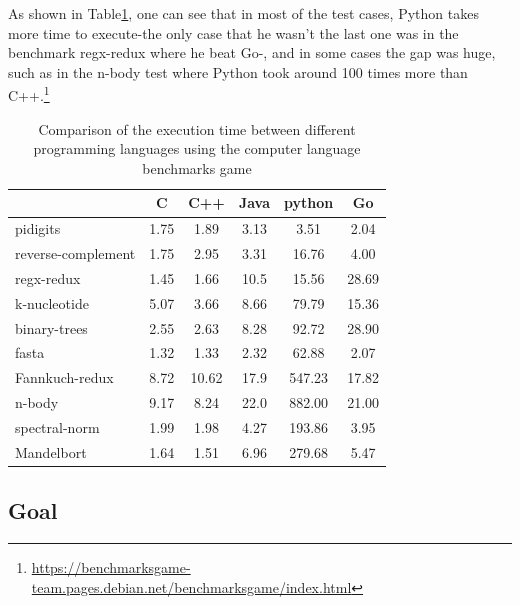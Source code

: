 As shown in Table\ref{fig:clbg}, one can see that in most of the test cases, Python takes more time to execute-the only case that he wasn't the last one was in the benchmark regx-redux where he beat Go-, and in some cases the gap was huge, such as in the n-body test where Python took around 100 times more than C++.\footnote{\url{https://benchmarksgame-team.pages.debian.net/benchmarksgame/index.html}}
\begin{table}[hbt]
    \begin{tabular}{l|*{5}c}
                           & C    & C++   & Java & python & Go    \\
        \hline
        pidigits           & 1.75 & 1.89  & 3.13 & 3.51   & 2.04  \\
        reverse-complement & 1.75 & 2.95  & 3.31 & 16.76  & 4.00  \\
        regx-redux         & 1.45 & 1.66  & 10.5 & 15.56  & 28.69 \\
        k-nucleotide       & 5.07 & 3.66  & 8.66 & 79.79  & 15.36 \\
        binary-trees       & 2.55 & 2.63  & 8.28 & 92.72  & 28.90 \\
        fasta              & 1.32 & 1.33  & 2.32 & 62.88  & 2.07  \\
        Fannkuch-redux     & 8.72 & 10.62 & 17.9 & 547.23 & 17.82 \\
        n-body             & 9.17 & 8.24  & 22.0 & 882.00 & 21.00 \\
        spectral-norm      & 1.99 & 1.98  & 4.27 & 193.86 & 3.95  \\
        Mandelbort         & 1.64 & 1.51  & 6.96 & 279.68 & 5.47  \\
    \end{tabular}
    \caption{Comparison of the execution time between different programming languages using the computer language benchmarks game}
    \label{fig:clbg}
\end{table}


\subsection{Goal}


